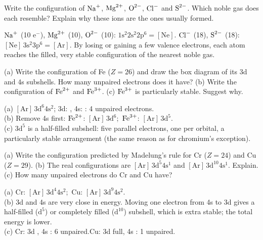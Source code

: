 Write the configuration of $\ce{Na+}$, $\ce{Mg^2+}$, $\ce{O^2-}$, $\ce{Cl-}$ and $\ce{S^2-}$. Which noble gas
does each resemble? Explain why these ions are the ones usually formed.
\begin{solution}
$\ce{Na+}$ (10 e$^-$), $\ce{Mg^2+}$ (10), $\ce{O^2-}$ (10): $1\mathrm s^2 2\mathrm s^2 2\mathrm p^6 = [\mathrm{Ne}]$.\quad
$\ce{Cl-}$ (18), $\ce{S^2-}$ (18): $[\mathrm{Ne}]\,3\mathrm s^2 3\mathrm p^6 = [\mathrm{Ar}]$.
By losing or gaining a few valence electrons, each atom reaches the filled, very stable configuration of
the nearest noble gas.
\end{solution}

(a) Write the configuration of Fe ($Z = 26$) and draw the box diagram of its 3d and 4s subshells.
How many unpaired electrons does it have? (b) Write the configuration of $\ce{Fe^2+}$ and $\ce{Fe^3+}$.
(c) $\ce{Fe^3+}$ is particularly stable. Suggest why.
\begin{solution}
(a) $[\mathrm{Ar}]\,3\mathrm d^6 4\mathrm s^2$; 3d: , 4s: : 4 unpaired electrons.\\
(b) Remove 4s first: $\ce{Fe^2+}$: $[\mathrm{Ar}]\,3\mathrm d^6$;\ $\ce{Fe^3+}$: $[\mathrm{Ar}]\,3\mathrm d^5$.\\
(c) $3\mathrm d^5$ is a half-filled subshell: five parallel electrons, one per orbital, a particularly
stable arrangement (the same reason as for chromium's exception).
\end{solution}

(a) Write the configuration predicted by Madelung's rule for Cr ($Z = 24$) and Cu ($Z = 29$).
(b) The real configurations are $[\mathrm{Ar}]\,3\mathrm d^5 4\mathrm s^1$ and
$[\mathrm{Ar}]\,3\mathrm d^{10} 4\mathrm s^1$. Explain. (c) How many unpaired electrons do Cr and Cu have?
\begin{solution}
(a) Cr: $[\mathrm{Ar}]\,3\mathrm d^4 4\mathrm s^2$;\ Cu: $[\mathrm{Ar}]\,3\mathrm d^9 4\mathrm s^2$.\\
(b) 3d and 4s are very close in energy. Moving one electron from 4s to 3d gives a half-filled
($\mathrm d^5$) or completely filled ($\mathrm d^{10}$) subshell, which is extra stable; the total energy is
lower.\\
(c) Cr: 3d , 4s : 6 unpaired.\quad Cu: 3d full, 4s : 1 unpaired.
\end{solution}

